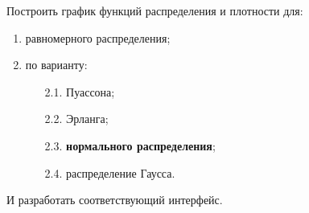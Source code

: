 Построить график функций распределения и плотности для:
\begin{enumerate}
	\item равномерного распределения;
	\item по варианту:
	\begin{enumerate}
		\item[2.1.] Пуассона;
		\item[2.2.] Эрланга;
		\item[2.3.] \textbf{нормального распределения};
		\item[2.4.] распределение Гаусса.
	\end{enumerate}
\end{enumerate}
И разработать соответствующий интерфейс.